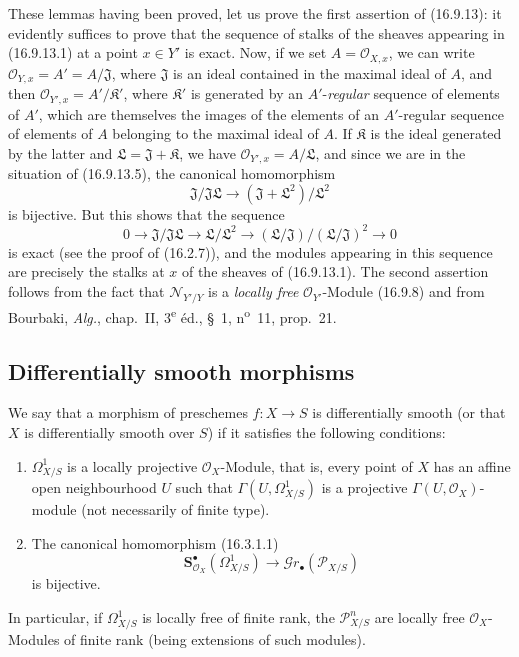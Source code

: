 These lemmas having been proved, let us prove the first assertion of
(16.9.13): it evidently suffices
to prove that the sequence of stalks of the sheaves appearing in
(16.9.13.1) at a point $x\in Y'$ is exact. Now, if we set
$A=\mathcal{O}_{X,x}$, we can write
$\mathcal{O}_{Y,x}=A'=A/\mathfrak{J}$, where $\mathfrak{J}$ is an ideal
contained in the maximal ideal of $A$, and then
$\mathcal{O}_{Y',x}=A'/\mathfrak{K}'$, where $\mathfrak{K}'$ is generated by
an $A'$-\emph{regular} sequence of elements of $A'$, which are themselves the images
of the elements of an $A'$-regular sequence of elements of $A$ belonging to
the maximal ideal of $A$. If $\mathfrak{K}$ is the ideal generated by the
latter and $\mathfrak{L}=\mathfrak{J}+\mathfrak{K}$, we have
$\mathcal{O}_{Y',x}=A/\mathfrak{L}$, and since we are in the situation of
(16.9.13.5), the canonical homomorphism
\[
  \mathfrak{J}/\mathfrak{J}\mathfrak{L}
  \longrightarrow(\mathfrak{J}+\mathfrak{L}^2)/\mathfrak{L}^2
\]
is bijective. But this shows that the sequence
\[
  0\longrightarrow\mathfrak{J}/\mathfrak{J}\mathfrak{L}
  \longrightarrow\mathfrak{L}/\mathfrak{L}^2
  \longrightarrow(\mathfrak{L}/\mathfrak{J})/
    (\mathfrak{L}/\mathfrak{J})^2\longrightarrow0
\]
is exact (see the proof of (16.2.7)), and the modules appearing in this
sequence are precisely the stalks at $x$ of the sheaves of (16.9.13.1).
The second assertion follows from the fact that $\mathcal{N}_{Y'/Y}$ is a
\emph{locally free} $\mathcal{O}_{Y'}$-Module (16.9.8) and from Bourbaki,
\emph{Alg.}, chap.~II, 3\textsuperscript{e} éd., §~1, n\textsuperscript{o}~11,
prop.~21.

\subsection{Differentially smooth morphisms}

\begin{definition}[16.10.1]\label{IV.16.10.1}
We say that a morphism of preschemes $f:X\to S$ is
differentially smooth (or that $X$ is differentially
smooth over $S$) if it satisfies the following conditions:
\begin{enumerate}
  \item[\textup{(i)}] $\varOmega_{X/S}^1$ is a locally projective
  $\mathcal{O}_X$-Module, that is, every point of $X$ has an affine open
  neighbourhood $U$ such that $\Gamma(U,\varOmega_{X/S}^1)$ is a projective
  $\Gamma(U,\mathcal{O}_X)$-module (not necessarily of finite
  type).
  \item[\textup{(ii)}] The canonical homomorphism \textup{(16.3.1.1)}
  \[
    \mathbf{S}_{\mathcal{O}_X}^{\bullet}(\varOmega_{X/S}^1)
    \longrightarrow\mathscr{G}r_{\bullet}(\mathscr{P}_{X/S})
  \]
  is bijective.
\end{enumerate}
In particular, if $\varOmega_{X/S}^1$ is locally free of finite rank, the
$\mathscr{P}_{X/S}^n$ are locally free $\mathcal{O}_X$-Modules of finite
rank \textup{(being extensions of such modules)}.
\end{definition}

